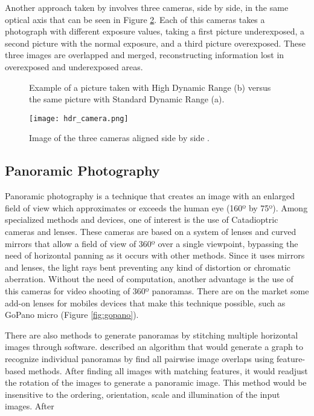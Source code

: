 Another approach taken by \cite{Vavilin2011} involves three cameras, side by side, in the same optical axis that can be seen in Figure \ref{fig:hdr_camera}. Each of this cameras takes a photograph with different exposure values, taking a first picture underexposed, a second picture with the normal exposure, and a third picture overexposed. These three images are overlapped and merged, reconstructing information lost in overexposed and underexposed areas.

\begin{figure}[htbp]
        \centering
  \caption{Example of a picture taken with High Dynamic Range (b) versus the same picture with Standard Dynamic Range (a).}
  \label{fig:hdr_example}
\end{figure}

\begin{figure}[htbp]
	\centering
	\texttt{[image: hdr\_camera.png]}
	\caption{Image of the three cameras aligned side by side \cite{Vavilin2011}.}
	\label{fig:hdr_camera}
\end{figure}

\subsection{Panoramic Photography}

Panoramic photography is a technique that creates an image with an enlarged field of view which approximates or exceeds the human eye (160º by 75º). Among specialized methods and devices, one of interest is the use of Catadioptric cameras and lenses. These cameras are based on a system of lenses and curved mirrors that allow a field of view of 360º over a single viewpoint, bypassing the need of horizontal panning as it occurs with other methods. Since it uses mirrors and lenses, the light rays bent preventing any kind of distortion or chromatic aberration. Without the need of computation, another advantage is the use of this cameras for video shooting of 360º panoramas. 
There are on the market some add-on lenses for mobiles devices that make this technique possible, such as GoPano micro (Figure \ref{fig:gopano}).

There are also methods to generate panoramas by stitching multiple horizontal images through software.
\citeauthor{Brown2006} \cite{Brown2006} described an algorithm that would generate a graph to recognize individual panoramas by find all pairwise image overlaps using feature-based methods. After finding all images with matching features, it would readjust the rotation of the images to generate a panoramic image. This method would be insensitive to the ordering, orientation, scale and illumination of the input images. After

